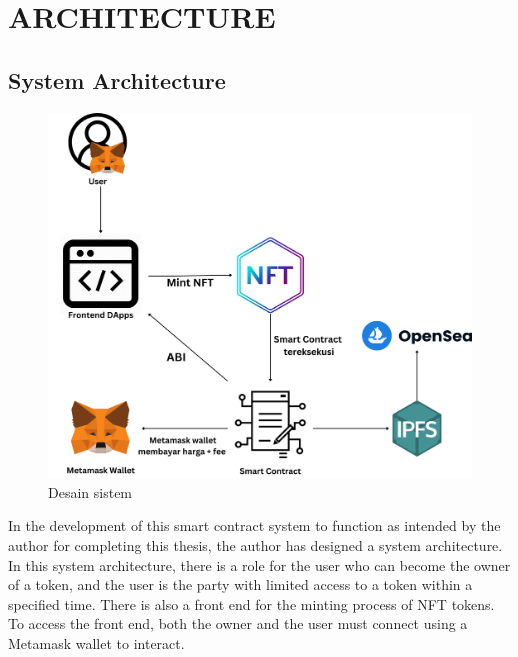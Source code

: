 \section{ARCHITECTURE}
\label{sec:arsitektur}

\subsection{System Architecture}
\begin{figure}[H] \centering
  \includegraphics[scale=0.14]{gambar/desain_sistem_new.png}
  \caption{Desain sistem}
  \label{fig:desain_sistem}
\end{figure}

In the development of this smart contract system to function as intended by the author for completing this thesis, the author has designed a system architecture. In this system architecture, there is a role for the user who can become the owner of a token, and the user is the party with limited access to a token within a specified time. There is also a front end for the minting process of NFT tokens. To access the front end, both the owner and the user must connect using a Metamask wallet to interact.



